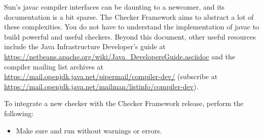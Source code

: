 Sun's javac compiler interfaces can be daunting to a
newcomer, and its documentation is a bit sparse. The Checker Framework
aims to abstract a lot of these complexities.
You do not have to understand the implementation of javac to
build powerful and useful checkers.
Beyond this document,
other useful resources include the Java Infrastructure
Developer's guide at
\url{https://netbeans.apache.org/wiki/Java_DevelopersGuide.asciidoc} and the compiler
mailing list archives at
\url{https://mail.openjdk.java.net/pipermail/compiler-dev/}
(subscribe at
\url{https://mail.openjdk.java.net/mailman/listinfo/compiler-dev}).




To integrate a new checker with the Checker Framework release, perform
the following:

\begin{itemize}

\item Make sure  and  run
without warnings or errors.

\end{itemize}


